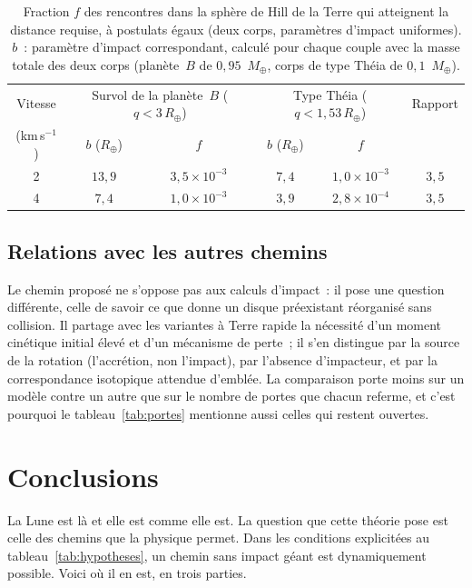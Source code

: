 \documentclass[11pt,a4paper]{article}
\newcommand{\Rt}{\ensuremath{R_\oplus}}
\newcommand{\Mt}{\ensuremath{M_\oplus}}
\begin{document}
\begin{table}[htbp]
\centering
\caption{Fraction $f$ des rencontres dans la sphère de Hill de la Terre qui atteignent la distance requise, à postulats égaux (deux corps, paramètres d'impact uniformes). $b$~: paramètre d'impact correspondant, calculé pour chaque couple avec la masse totale des deux corps (planète~$B$ de $0{,}95$~$\Mt$, corps de type Théia de $0{,}1$~$\Mt$).\label{tab:rencontre}}
\small
\begin{tabular}{cccccc}
\toprule
Vitesse & \multicolumn{2}{c}{Survol de la planète~$B$ ($q<3\,\Rt$)} & \multicolumn{2}{c}{Type Théia ($q<1{,}53\,\Rt$)} & Rapport \\
(km\,s$^{-1}$) & $b$ ($\Rt$) & $f$ & $b$ ($\Rt$) & $f$ & \\
\midrule
2 & $13{,}9$ & $3{,}5\times10^{-3}$ & $7{,}4$ & $1{,}0\times10^{-3}$ & $3{,}5$ \\
4 & $7{,}4$ & $1{,}0\times10^{-3}$ & $3{,}9$ & $2{,}8\times10^{-4}$ & $3{,}5$ \\
\bottomrule
\end{tabular}
\end{table}

\subsection{Relations avec les autres chemins}

Le chemin proposé ne s'oppose pas aux calculs d'impact~: il pose une question différente, celle de savoir ce que donne un disque préexistant réorganisé sans collision. Il partage avec les variantes à Terre rapide la nécessité d'un moment cinétique initial élevé et d'un mécanisme de perte~; il s'en distingue par la source de la rotation (l'accrétion, non l'impact), par l'absence d'impacteur, et par la correspondance isotopique attendue d'emblée. La comparaison porte moins sur un modèle contre un autre que sur le nombre de portes que chacun referme, et c'est pourquoi le tableau~\ref{tab:portes} mentionne aussi celles qui restent ouvertes.

\section{Conclusions}
\label{sec:conclusions}

La Lune est là et elle est comme elle est. La question que cette théorie pose est celle des chemins que la physique permet. Dans les conditions explicitées au tableau~\ref{tab:hypotheses}, un chemin sans impact géant est dynamiquement possible. Voici où il en est, en trois parties.
\end{document}
